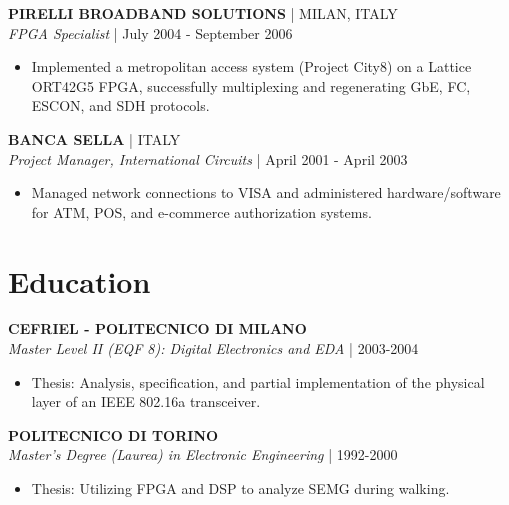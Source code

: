 \documentclass[10pt, letterpaper]{article}
\begin{document}
\vspace{6pt}
\noindent \textbf{PIRELLI BROADBAND SOLUTIONS} | MILAN, ITALY\\
\textit{FPGA Specialist} | July 2004 - September 2006
\begin{itemize}[leftmargin=*, nosep]
    \item Implemented a metropolitan access system (Project City8) on a Lattice ORT42G5 FPGA, successfully multiplexing and regenerating GbE, FC, ESCON, and SDH protocols.
\end{itemize}

\vspace{6pt}
\noindent \textbf{BANCA SELLA} | ITALY\\
\textit{Project Manager, International Circuits} | April 2001 - April 2003
\begin{itemize}[leftmargin=*, nosep]
    \item Managed network connections to VISA and administered hardware/software for ATM, POS, and e-commerce authorization systems.
\end{itemize}

\section*{Education}
\noindent \textbf{CEFRIEL - POLITECNICO DI MILANO}\\
\textit{Master Level II (EQF 8): Digital Electronics and EDA} | 2003-2004
\begin{itemize}[leftmargin=*, nosep]
    \item Thesis: Analysis, specification, and partial implementation of the physical layer of an IEEE 802.16a transceiver.
\end{itemize}

\vspace{6pt}
\noindent \textbf{POLITECNICO DI TORINO}\\
\textit{Master's Degree (Laurea) in Electronic Engineering} | 1992-2000
\begin{itemize}[leftmargin=*, nosep]
    \item Thesis: Utilizing FPGA and DSP to analyze SEMG during walking.
\end{itemize}

\end{document}
